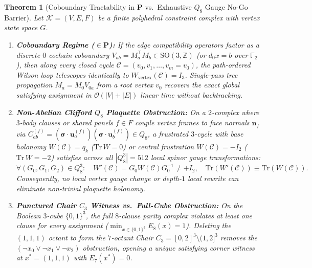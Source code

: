 \documentclass[11pt,a4paper]{article}
\newtheorem{theorem}{Theorem}[section]
\theoremstyle{definition}
\begin{document}
\begin{theorem}[Coboundary Tractability in $\mathbf{P}$ vs.\ Exhaustive $Q_8$ Gauge No-Go Barrier]
\label{thm:dichotomy}
\leavevmode
Let $\mathcal{K} = (V, E, F)$ be a finite polyhedral constraint complex with vertex state space $G$.
\begin{enumerate}
    \item \textbf{Coboundary Regime ($\in \mathbf{P}$):} If the edge compatibility operators factor as a discrete $0$-cochain coboundary $V_{ab} = M_a^\top M_b \in \mathrm{SO}(3,\mathbb{Z})$ (or $d_0 x = b$ over $\mathbb{F}_2$), then along every closed cycle $\mathcal{C} = (v_0, v_1, \dots, v_m = v_0)$, the path-ordered Wilson loop telescopes identically to $W_{\mathrm{vertex}}(\mathcal{C}) = I_3$. Single-pass tree propagation $M_a = M_0 V_{0a}$ from a root vertex $v_0$ recovers the exact global satisfying assignment in $\mathcal{O}(|V|+|E|)$ linear time without backtracking.
    \item \textbf{Non-Abelian Clifford $Q_8$ Plaquette Obstruction:} On a $2$-complex where $3$-body clauses or shared panels $f \in F$ couple vertex frames to face normals $\mathbf{n}_f$ via $C_{ab}^{(f)} = (\boldsymbol{\sigma}\cdot \mathbf{u}_a^{(f)})(\boldsymbol{\sigma}\cdot \mathbf{u}_b^{(f)}) \in Q_8$, a frustrated $3$-cycle with base holonomy $W(\mathcal{C}) = q_k$ ($\mathrm{Tr}\,W = 0$) or central frustration $W(\mathcal{C}) = -I_2$ ($\mathrm{Tr}\,W = -2$) satisfies across all $|Q_8^3| = 512$ local spinor gauge transformations:
    \begin{equation}
    \forall (G_0, G_1, G_2) \in Q_8^3 : \quad W'(\mathcal{C}) = G_0 W(\mathcal{C}) G_0^{-1} \neq +I_2, \quad \mathrm{Tr}(W'(\mathcal{C})) \equiv \mathrm{Tr}(W(\mathcal{C})).
    \end{equation}
    Consequently, no local vertex gauge change or depth-$1$ local rewrite can eliminate non-trivial plaquette holonomy.
    \item \textbf{Punctured Chair $C_3$ Witness vs.\ Full-Cube Obstruction:} On the Boolean $3$-cube $\{0,1\}^3$, the full $8$-clause parity complex violates at least one clause for every assignment ($\min_{x\in\{0,1\}^3} E_8(x) = 1$). Deleting the $(1,1,1)$ octant to form the $7$-octant Chair $C_3 = [0,2]^3\setminus(1,2]^3$ removes the $(\neg x_0 \lor \neg x_1 \lor \neg x_2)$ obstruction, opening a unique satisfying corner witness at $x^* = (1,1,1)$ with $E_7(x^*) = 0$.
\end{enumerate}
\end{theorem}
\end{document}
